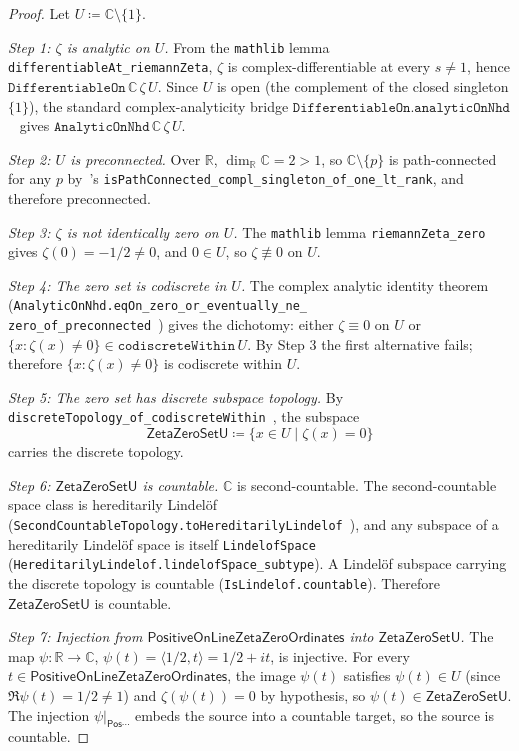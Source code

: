 \documentclass[11pt,a4paper]{amsart}
\theoremstyle{plain}
\theoremstyle{definition}
\begin{document}
\begin{proof}
Let $U \coloneqq \mathbb{C}\setminus\{1\}$.

\emph{Step 1: $\zeta$ is analytic on $U$.}
From the \texttt{mathlib} lemma \texttt{differentiableAt\_riemannZeta}, $\zeta$ is complex-differentiable at every $s \neq 1$, hence $\texttt{DifferentiableOn}\,\mathbb{C}\,\zeta\,U$. Since $U$ is open (the complement of the closed singleton $\{1\}$), the standard complex-analyticity bridge $\texttt{DifferentiableOn.analyticOnNhd}$~\cite{mathlib2020} gives $\texttt{AnalyticOnNhd}\,\mathbb{C}\,\zeta\,U$.

\emph{Step 2: $U$ is preconnected.}
Over $\mathbb{R}$, $\dim_{\mathbb{R}}\mathbb{C} = 2 > 1$, so $\mathbb{C}\setminus\{p\}$ is path-connected for any $p$ by~\cite{mathlib2020}'s \texttt{isPathConnected\_compl\_singleton\_of\_one\_lt\_rank}, and therefore preconnected.

\emph{Step 3: $\zeta$ is not identically zero on $U$.}
The \texttt{mathlib} lemma \texttt{riemannZeta\_zero} gives $\zeta(0) = -1/2 \neq 0$, and $0 \in U$, so $\zeta \not\equiv 0$ on $U$.

\emph{Step 4: The zero set is codiscrete in $U$.}
The complex analytic identity theorem (\texttt{AnalyticOnNhd.eqOn\_zero\_or\_eventually\_ne\_\\zero\_of\_preconnected}~\cite{mathlib2020}) gives the dichotomy: either $\zeta \equiv 0$ on $U$ or $\{x : \zeta(x) \neq 0\} \in \texttt{codiscreteWithin}\,U$. By Step 3 the first alternative fails; therefore $\{x : \zeta(x) \neq 0\}$ is codiscrete within $U$.

\emph{Step 5: The zero set has discrete subspace topology.}
By \texttt{discreteTopology\_of\_codiscreteWithin}~\cite{mathlib2020}, the subspace
\[
\textsf{ZetaZeroSetU} \coloneqq \{x \in U \mid \zeta(x) = 0\}
\]
carries the discrete topology.

\emph{Step 6: $\textsf{ZetaZeroSetU}$ is countable.}
$\mathbb{C}$ is second-countable. The second-countable space class is hereditarily Lindel\"of (\texttt{SecondCountableTopology.toHereditarilyLindelof}~\cite{mathlib2020}), and any subspace of a hereditarily Lindel\"of space is itself \texttt{LindelofSpace} (\texttt{HereditarilyLindelof.lindelofSpace\_subtype}). A Lindel\"of subspace carrying the discrete topology is countable (\texttt{IsLindelof.countable}). Therefore $\textsf{ZetaZeroSetU}$ is countable.

\emph{Step 7: Injection from $\textsf{PositiveOnLineZetaZeroOrdinates}$ into $\textsf{ZetaZeroSetU}$.}
The map $\psi : \mathbb{R} \to \mathbb{C}$, $\psi(t) = \langle 1/2, t\rangle = 1/2 + it$, is injective. For every $t \in \textsf{PositiveOnLineZetaZeroOrdinates}$, the image $\psi(t)$ satisfies $\psi(t) \in U$ (since $\Re\psi(t) = 1/2 \neq 1$) and $\zeta(\psi(t)) = 0$ by hypothesis, so $\psi(t) \in \textsf{ZetaZeroSetU}$. The injection $\psi|_{\textsf{Pos}\cdots}$ embeds the source into a countable target, so the source is countable.
\end{proof}
\end{document}
